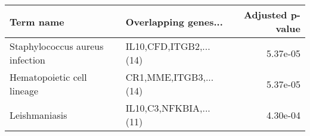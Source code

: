 \begin{tabular}{llr}
\toprule
                      Term name &   Overlapping genes... &  Adjusted p-value \\
\midrule
Staphylococcus aureus infection & IL10,CFD,ITGB2,...(14) &          5.37e-05 \\
     Hematopoietic cell lineage &  CR1,MME,ITGB3,...(14) &          5.37e-05 \\
                  Leishmaniasis & IL10,C3,NFKBIA,...(11) &          4.30e-04 \\
\bottomrule
\end{tabular}
